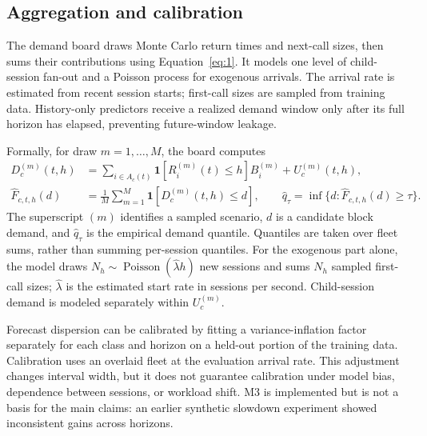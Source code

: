 \documentclass[11pt,a4paper]{article}
\begin{document}
\subsection{Aggregation and calibration}
\label{sec:3.3}
The demand board draws Monte Carlo return times and next-call sizes, then sums their contributions using Equation~\eqref{eq:1}. It models one level of child-session fan-out and a Poisson process for exogenous arrivals. The arrival rate is estimated from recent session starts; first-call sizes are sampled from training data. History-only predictors receive a realized demand window only after its full horizon has elapsed, preventing future-window leakage.

Formally, for draw \(m=1,\ldots,M\), the board computes
\begin{align}
D_c^{(m)}(t,h)&=\sum_{i\in A_c(t)}\mathbf{1}[R_i^{(m)}(t)\le h]B_i^{(m)}+U_c^{(m)}(t,h),\\
\widehat F_{c,t,h}(d)&=\frac{1}{M}\sum_{m=1}^{M}\mathbf{1}[D_c^{(m)}(t,h)\le d],\qquad
\widehat q_\tau=\inf\{d:\widehat F_{c,t,h}(d)\ge\tau\}.
\label{eq:mc}
\end{align}
The superscript \((m)\) identifies a sampled scenario, \(d\) is a candidate block demand, and \(\widehat q_\tau\) is the empirical demand quantile. Quantiles are taken over fleet sums, rather than summing per-session quantiles. For the exogenous part alone, the model draws \(N_h\sim\operatorname{Poisson}(\widehat\lambda h)\) new sessions and sums \(N_h\) sampled first-call sizes; \(\widehat\lambda\) is the estimated start rate in sessions per second. Child-session demand is modeled separately within \(U_c^{(m)}\).


Forecast dispersion can be calibrated by fitting a variance-inflation factor separately for each class and horizon on a held-out portion of the training data. Calibration uses an overlaid fleet at the evaluation arrival rate. This adjustment changes interval width, but it does not guarantee calibration under model bias, dependence between sessions, or workload shift. M3 is implemented but is not a basis for the main claims: an earlier synthetic slowdown experiment showed inconsistent gains across horizons.
\end{document}
